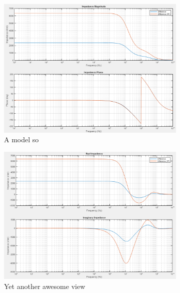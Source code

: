 \begin{figure}[h]
    \centering
    \begin{subfigure}[b]{0.45\textwidth}
        \centering
        \includegraphics[width=\textwidth]{images/IS_APP_mag_phase.png}
        \caption{A model so}
    \end{subfigure}
    \hfill
    \begin{subfigure}[b]{0.45\textwidth}
        \centering
        \includegraphics[width=\textwidth]{images/IS_APP_real_imag.png}
        \caption{Yet another awesome view}
    \end{subfigure}
    \\
    \begin{subfigure}[b]{0.45\textwidth}
        \centering

\end{subfigure}
\end{figure}
